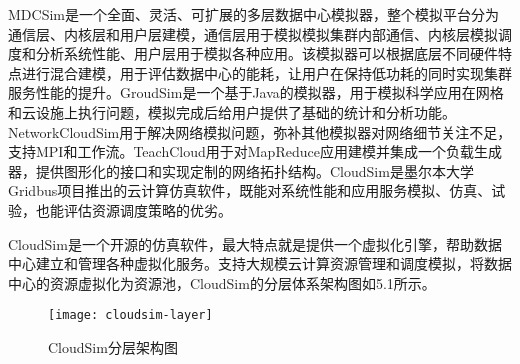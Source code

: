 MDCSim是一个全面、灵活、可扩展的多层数据中心模拟器，整个模拟平台分为通信层、内核层和用户层建模，通信层用于模拟模拟集群内部通信、内核层模拟调度和分析系统性能、用户层用于模拟各种应用。该模拟器可以根据底层不同硬件特点进行混合建模，用于评估数据中心的能耗，让用户在保持低功耗的同时实现集群服务性能的提升。GroudSim是一个基于Java的模拟器，用于模拟科学应用在网格和云设施上执行问题，模拟完成后给用户提供了基础的统计和分析功能。NetworkCloudSim用于解决网络模拟问题，弥补其他模拟器对网络细节关注不足，支持MPI和工作流。TeachCloud用于对MapReduce应用建模并集成一个负载生成器，提供图形化的接口和实现定制的网络拓扑结构。CloudSim是墨尔本大学Gridbus项目推出的云计算仿真软件，既能对系统性能和应用服务模拟、仿真、试验，也能评估资源调度策略的优劣。

CloudSim是一个开源的仿真软件，最大特点就是提供一个虚拟化引擎，帮助数据中心建立和管理各种虚拟化服务。支持大规模云计算资源管理和调度模拟，将数据中心的资源虚拟化为资源池，CloudSim的分层体系架构图如5.1所示。
\begin{figure}[H] %
	\centering
	\texttt{[image: cloudsim-layer]}
	\caption{CloudSim分层架构图}
	\label{fig:xfig1}
\end{figure}

